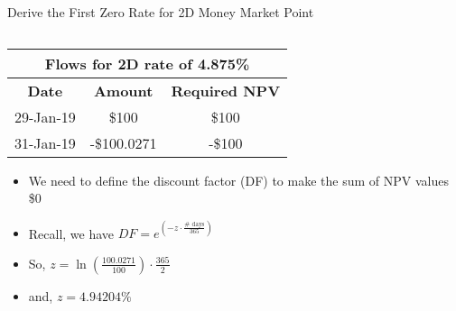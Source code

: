 \documentclass[handout, aspectratio=169]{beamer}
\begin{document}
\begin{frame}{Derive the First Zero Rate for 2D Money Market Point}
\begin{columns}[T]
	  \begin{column}{0.7\textwidth}
		  \begin{table}[t]
			  \centering
			  \begin{adjustbox}{max width=0.6\textwidth}
				  \begin{tabular}{|c|c|c|} 
					  \hline
					  \multicolumn{3}{|c|}{\textbf{Flows for 2D rate of 4.875\%}} \\
					  \hline
					  \textbf{Date} & \textbf{Amount}  & \textbf{Required NPV}\\				
					  \hline
					  29-Jan-19 & \$100 & \$100 \\
					  \hline
					  31-Jan-19 & -\$100.0271 & -\$100 \\
					  \hline
				  \end{tabular}
			  \end{adjustbox}
		  \end{table}
		  \begin{itemize}
			\item We need to define the discount factor (DF) to make the sum of NPV values \$0
			\item Recall, we have $DF = e^{(-z \cdot \frac{\# \text{ days}}{365})}$
			\item So, $z = \ln(\frac{100.0271}{100}) \cdot \frac{365}{2}$
			\item and, $z = 4.94204\%$
		  \end{itemize}
	   \end{column}
  \end{columns}
\end{frame}
\end{document}
